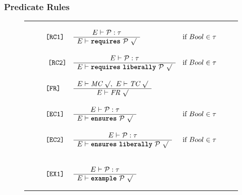 \documentclass[12pt]{article} %
\newcommand{\reserved}[1]{\textbf{\texttt{#1}}} %
\newcommand{\RULELAB}[1]{\texttt{#1}}
\newcommand{\UNSPACEFORBOX}{\vspace{-2ex}}
\newcommand{\HLINE}{\UNSPACEFORBOX%
\begin{flushleft}\rule{\textwidth}{0.01in}\end{flushleft}%
\UNSPACEFORBOX}
\newenvironment{BFIGURE}{

\begin{figure}
\small
\HLINE
}{
\HLINE
\normalsize
\end{figure}
}
\begin{document}
\subsubsection{Predicate Rules}
\label{predrules}
\begin{BFIGURE}
\begin{displaymath}
\begin{array}{llc}

\RULELAB{[RC1]} &
\begin{array}{c}
E \vdash \mathcal{P}: \tau\\
\hline
E \vdash \mbox{\reserved{requires} }\mathcal{P}~ \surd
\end{array}
&
\mbox{if $Bool \in \tau$}
\\
~\\\
\RULELAB{[RC2]} &
\begin{array}{c}
E \vdash \mathcal{P}: \tau\\
\hline
E \vdash \mbox{\reserved{requires} \reserved{liberally} }\mathcal{P}~ \surd
\end{array}
&
\mbox{if $Bool \in \tau$}
\\
~\\
\RULELAB{[FR]} &
\begin{array}{c}
E \vdash \mbox{\it MC}~ \surd,~E \vdash \mbox{\it TC}~ \surd\\
\hline
E \vdash \mbox{\it FR}~ \surd
\end{array}
\\
~\\
\RULELAB{[EC1]} &
\begin{array}{c}
E \vdash \mathcal{P}: \tau\\
\hline
E \vdash \mbox{\reserved{ensures} }\mathcal{P}~ \surd
\end{array}
&
\mbox{if $Bool \in \tau$}
\\
~\\
\RULELAB{[EC2]} &
\begin{array}{c}
E \vdash \mathcal{P}: \tau\\
\hline
E \vdash \mbox{\reserved{ensures} \reserved{liberally} }\mathcal{P}~\surd
\end{array}
&
\mbox{if $Bool \in \tau$}
\\
~\\
~\\
\RULELAB{[EX1]} &
\begin{array}{c}
E \vdash \mathcal{P}: \tau\\
\hline
E \vdash \mbox{\reserved{example} }\mathcal{P}~ \surd
\end{array}

\end{array}
\end{displaymath}
\end{BFIGURE}
\end{document}
